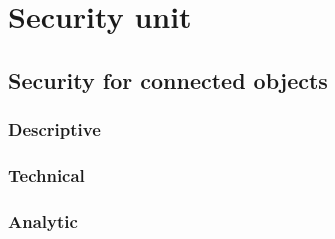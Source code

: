 \chapter{Security unit}

\section{Security for connected objects}
\subsection{Descriptive}
\subsection{Technical}
\subsection{Analytic}